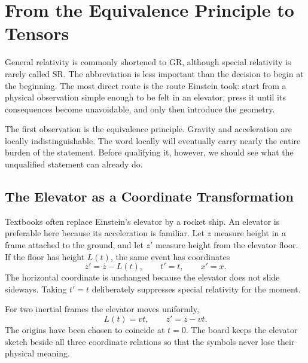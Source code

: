 \chapter{From the Equivalence Principle to Tensors}

General relativity is commonly shortened to GR, although special
relativity is rarely called SR. The abbreviation is less important than
the decision to begin at the beginning. The most direct route is the
route Einstein took: start from a physical observation simple enough to
be felt in an elevator, press it until its consequences become
unavoidable, and only then introduce the geometry.

The first observation is the equivalence principle. Gravity and
acceleration are locally indistinguishable. The word locally will
eventually carry nearly the entire burden of the statement. Before
qualifying it, however, we should see what the unqualified statement can
already do.

\section{The Elevator as a Coordinate Transformation}

Textbooks often replace Einstein's elevator by a rocket ship. An
elevator is preferable here because its acceleration is familiar. Let
\(z\) measure height in a frame attached to the ground, and let \(z'\)
measure height from the elevator floor. If the floor has height \(L(t)\),
the same event has coordinates
\begin{equation}
 z'=z-L(t),\qquad t'=t,\qquad x'=x.
\label{eq:elevator-map}
\end{equation}
The horizontal coordinate is unchanged because the elevator does not
slide sideways. Taking \(t'=t\) deliberately suppresses special
relativity for the moment.

\begin{classroomqa}
\end{classroomqa}

For two inertial frames the elevator moves uniformly,
\begin{equation}
 L(t)=vt,\qquad z'=z-vt.
\label{eq:galilean-elevator}
\end{equation}
The origins have been chosen to coincide at \(t=0\). The board keeps the
elevator sketch beside all three coordinate relations so that the
symbols never lose their physical meaning.

